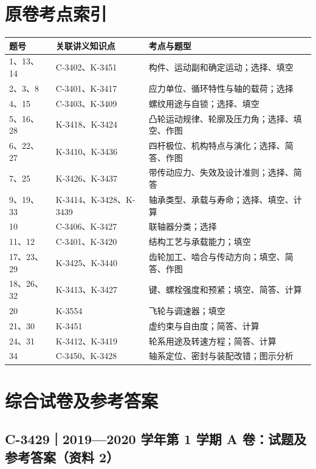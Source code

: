 \documentclass[zihao=5,a4paper,UTF8,fontset=fandol]{ctexart}
\begin{document}
\section{原卷考点索引}

\begin{longtable}{p{4.86cm}p{4.86cm}p{4.86cm}}
\toprule
题号 & 关联讲义知识点 & 考点与题型 \\

\midrule
\endhead
1、13、14 & C-3402、K-3451 & 构件、运动副和确定运动；选择、填空 \\
2、3、8 & C-3401、K-3417 & 应力单位、循环特性与轴的载荷；选择 \\
4、15 & C-3403、K-3409 & 螺纹用途与自锁；选择、填空 \\
5、16、28 & K-3418、K-3424 & 凸轮运动规律、轮廓及压力角；选择、填空、作图 \\
6、22、27 & K-3410、K-3436 & 四杆极位、机构特点与演化；选择、简答、作图 \\
7、25 & K-3426、K-3437 & 带传动应力、失效及设计准则；选择、简答 \\
9、19、33 & K-3414、K-3428、K-3439 & 轴承类型、承载与寿命；选择、填空、计算 \\
10 & C-3406、K-3427 & 联轴器分类；选择 \\
11、12 & C-3401、K-3420 & 结构工艺与承载能力；填空 \\
17、23、29 & K-3425、K-3440 & 齿轮加工、啮合与传动方向；填空、简答、作图 \\
18、26、32 & K-3413、K-3427 & 键、螺栓强度和预紧；填空、简答、计算 \\
20 & K-3554 & 飞轮与调速器；填空 \\
21、30 & K-3451 & 虚约束与自由度；简答、计算 \\
24、31 & K-3412、K-3419 & 轮系用途及转速方程；简答、计算 \\
34 & C-3450、K-3428 & 轴系定位、密封与装配改错；图示分析 \\
\bottomrule
\end{longtable}

\section{综合试卷及参考答案}




\subsection{C-3429｜2019—2020 学年第 1 学期 A 卷：试题及参考答案（资料 2）}
\label{c-3429}
\end{document}
